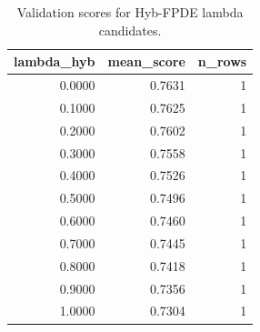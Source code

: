 \begin{table}[t]
\caption{Validation scores for Hyb-FPDE lambda candidates.}
\label{tab:lambda_distribution_computed}
\centering
\begin{tabular}{rrr}
\toprule
lambda\_hyb & mean\_score & n\_rows \\
\midrule
0.0000 & 0.7631 & 1 \\
0.1000 & 0.7625 & 1 \\
0.2000 & 0.7602 & 1 \\
0.3000 & 0.7558 & 1 \\
0.4000 & 0.7526 & 1 \\
0.5000 & 0.7496 & 1 \\
0.6000 & 0.7460 & 1 \\
0.7000 & 0.7445 & 1 \\
0.8000 & 0.7418 & 1 \\
0.9000 & 0.7356 & 1 \\
1.0000 & 0.7304 & 1 \\
\bottomrule
\end{tabular}

\end{table}
